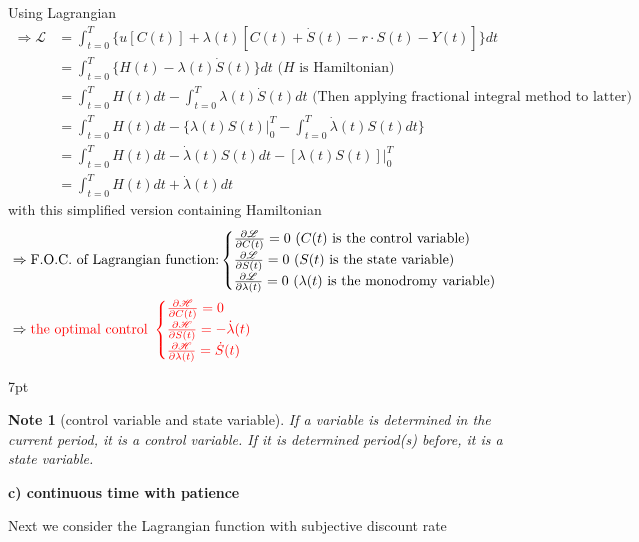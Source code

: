 \documentclass{article}
\newenvironment{blueblock}{
\def\FrameCommand{
  \hspace{1pt}
    {\color{DarkBlue}
    \vrule width 2pt}
    {\color{blueshade}
    \vrule width 4pt}
  \colorbox{blueshade}
}
\MakeFramed{
  \advance
  \hsize-
  \width
  \FrameRestore}
\noindent\hspace{-4.55pt}%
\begin{adjustwidth}{}{7pt}
\vspace{2pt}\vspace{2pt}
}
{\vspace{2pt}\end{adjustwidth}\endMakeFramed}
\newtheorem{note}{Note}
\begin{document}
Using Lagrangian
\begin{align}
\Rightarrow\mathscr{L}&=\int_{t=0}^{T} \{u[C(t)]+\lambda(t)[C(t)+\dot{S}(t)-r \cdot S(t)-Y(t)]\}dt
\\&=\int_{t=0}^{T} \{ H(t)-\lambda(t)\dot{S}(t)\}dt \text{ ($H$ is Hamiltonian)}
\\&=\int_{t=0}^{T} H(t)dt-\int_{t=0}^{T}\lambda(t)\dot{S}(t)dt \text{ (Then applying fractional integral method to latter)}
\\&=\int_{t=0}^{T} H(t)dt-\{ \lambda(t)S(t)|_{0}^{T} - \int_{t=0}^{T} \dot{\lambda}(t)S(t)dt \}
\\&=\int_{t=0}^{T} H(t)dt-\dot{\lambda}(t)S(t)dt-[\lambda(t)S(t)]|_{0}^{T}
\\&=\int_{t=0}^{T} H(t)dt+\dot{\lambda}(t)dt
\end{align}
with this simplified version containing Hamiltonian
\begin{align}
&\Rightarrow \text{F.O.C. of Lagrangian function:} \begin{cases}
\frac{\partial \mathscr{L}}{\partial C(t)}=0 \text{ (} C(t)\text{ is the control variable)}  \\
\frac{\partial \mathscr{L}}{\partial S(t)}=0 \text{ (} S(t)\text{ is the state variable)} \\
\frac{\partial \mathscr{L}}{\partial  \lambda(t)}=0 \text{ (} \lambda(t)\text{ is the monodromy variable)}\end{cases}
\\&\Rightarrow \color{red} \text{the optimal control }\begin{cases}
\frac{\partial \mathcal{H} }{\partial C(t)}=0 \\
\frac{\partial \mathcal{H}}{\partial S(t)}=-\dot\lambda(t) \\
\frac{\partial \mathcal{H}}{\partial \lambda(t)}=\dot S(t)\end{cases}
\end{align}


\begin{blueblock}
\begin{note}[control variable and state variable]
If a variable is determined in the current period, it is a control variable. If it is determined period(s) before, it is a state variable.
\end{note}
\end{blueblock}

\textbf{c) continuous time with patience}

Next we consider the Lagrangian function with subjective discount rate
\end{document}
